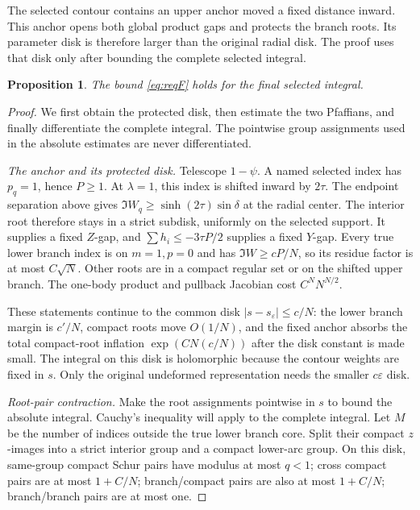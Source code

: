 \documentclass[11pt]{article}
\numberwithin{equation}{section}
\newtheorem{proposition}[theorem]{Proposition}
\theoremstyle{definition}
\newcommand{\eps}{\varepsilon}
\newcommand{\se}{s_\varepsilon}
\begin{document}
The selected contour contains an upper anchor moved a fixed distance
inward. This anchor opens both global product gaps and protects the
branch roots. Its parameter disk is therefore larger than the original
radial disk. The proof uses that disk only after bounding the complete
selected integral.
\begin{proposition}\label{prop:F}
The bound \eqref{eq:reqF} holds for the final selected integral.
\end{proposition}
\begin{proof}
We first obtain the protected disk, then estimate the two Pfaffians, and finally differentiate the complete integral. The pointwise group assignments used in the absolute estimates are never differentiated.

\smallskip\noindent\textit{The anchor and its protected disk.}
Telescope \(1-\psi\). A named selected index has \(p_q=1\), hence \(P\ge1\).
At \(\lambda=1\), this index is shifted inward by \(2\tau\).
The endpoint separation above gives
\(\Im W_q\ge\sinh(2\tau)\sin\delta\) at the radial center.
The interior root therefore stays in a strict subdisk, uniformly
on the selected support. It supplies a fixed \(Z\)-gap, and
\(\sum h_i\le-3\tau P/2\) supplies a fixed \(Y\)-gap.
Every true lower branch index is on \(m=1,p=0\) and has
\(\Im W\ge cP/N\), so its residue factor is at most \(C\sqrt N\).
Other roots are in a compact regular set or on the shifted upper
branch. The one-body product and pullback Jacobian cost
\(C^N N^{N/2}\).

These statements continue to the common disk \(|s-\se|\le c/N\):
the lower branch margin is \(c'/N\), compact roots move \(O(1/N)\),
and the fixed anchor absorbs the total compact-root inflation
\(\exp(CN(c/N))\) after the disk constant is made small.
The integral on this disk is holomorphic because the contour weights
are fixed in \(s\). Only the original undeformed representation needs
the smaller \(c\eps\) disk.

\smallskip\noindent\textit{Root-pair contraction.}
Make the root assignments pointwise in \(s\) to bound the absolute
integral. Cauchy's inequality will apply to the complete integral.
Let \(M\) be the number of indices outside the true lower branch core.
Split their compact \(z\)-images into a strict interior group and a
compact lower-arc group. On this disk, same-group compact Schur
pairs have modulus at most \(q<1\); cross compact pairs are at most
\(1+C/N\); branch/compact pairs are also at most \(1+C/N\);
branch/branch pairs are at most one.


\end{proof}
\end{document}

